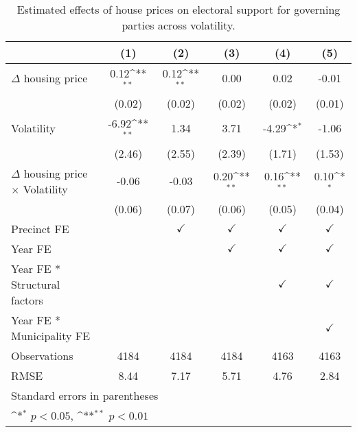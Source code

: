 \begin{table}[htbp]\centering
\def\sym#1{\ifmmode^{#1}\else\(^{#1}\)\fi}
\caption{Estimated effects of house prices on electoral support for governing parties across volatility.} \label{tab5}
\begin{tabular}{l*{5}{c}}
\hline\hline
                    &\multicolumn{1}{c}{(1)}        &\multicolumn{1}{c}{(2)}        &\multicolumn{1}{c}{(3)}        &\multicolumn{1}{c}{(4)}        &\multicolumn{1}{c}{(5)}        \\
\hline
$\Delta$ housing price&        0.12\sym{**}&        0.12\sym{**}&        0.00        &        0.02        &       -0.01        \\
                    &      (0.02)        &      (0.02)        &      (0.02)        &      (0.02)        &      (0.01)        \\
[1em]
Volatility          &       -6.92\sym{**}&        1.34        &        3.71        &       -4.29\sym{*} &       -1.06        \\
                    &      (2.46)        &      (2.55)        &      (2.39)        &      (1.71)        &      (1.53)        \\
[1em]
$\Delta$ housing price $\times$ Volatility&       -0.06        &       -0.03        &        0.20\sym{**}&        0.16\sym{**}&        0.10\sym{*} \\
                    &      (0.06)        &      (0.07)        &      (0.06)        &      (0.05)        &      (0.04)        \\
[1em]
\hline Precinct FE  &                    &$\checkmark$        &$\checkmark$        &$\checkmark$        &$\checkmark$        \\
[1em]
Year FE             &                    &                    &$\checkmark$        &$\checkmark$        &$\checkmark$        \\
[1em]
Year FE * Structural factors&                    &                    &                    &$\checkmark$        &$\checkmark$        \\
[1em]
Year FE * Municipality FE&                    &                    &                    &                    &$\checkmark$        \\
\hline
Observations        &        4184        &        4184        &        4184        &        4163        &        4163        \\
RMSE                &        8.44        &        7.17        &        5.71        &        4.76        &        2.84        \\
\hline\hline
\multicolumn{6}{l}{\footnotesize Standard errors in parentheses}\\
\multicolumn{6}{l}{\footnotesize \sym{*} \(p<0.05\), \sym{**} \(p<0.01\)}\\
\end{tabular}
\end{table}
